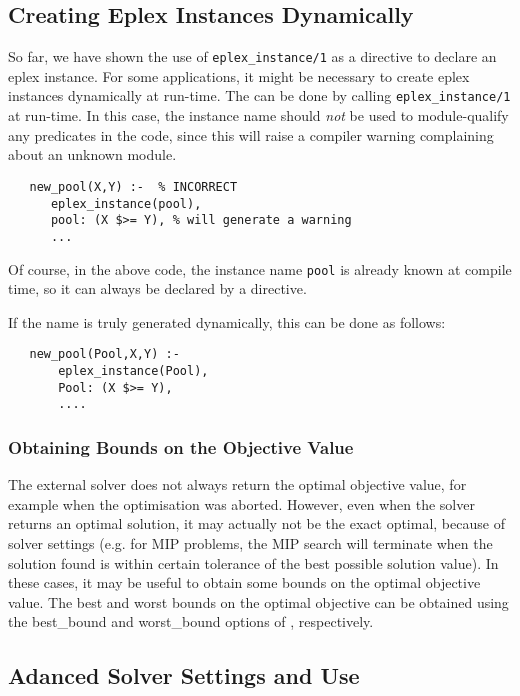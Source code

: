 \subsection{Creating Eplex Instances Dynamically}
So far, we have shown the use of {\tt eplex_instance/1} as a directive to
declare an eplex instance. For some applications, it might be necessary to
create eplex instances dynamically at run-time. The can be done by calling
{\tt eplex_instance/1} at run-time.
In this case, the instance name should {\em not} be used to module-qualify
any predicates in the code, since this will raise a compiler warning
complaining about an unknown module.

\begin{verbatim}
   new_pool(X,Y) :-  % INCORRECT
      eplex_instance(pool),
      pool: (X $>= Y), % will generate a warning
      ...
\end{verbatim}
\noindent
Of course, in the above code, the instance name {\tt pool} is already known
at compile time, so it can always be declared by a directive.

If the name is truly generated dynamically, this can be done as follows:
\begin{verbatim}
   new_pool(Pool,X,Y) :-
       eplex_instance(Pool),
       Pool: (X $>= Y),
       ....
\end{verbatim}

\subsubsection{Obtaining Bounds on the Objective Value}

The external solver does not always return the optimal objective
value, for example when the optimisation was aborted. However, even when
the solver returns an optimal solution, it may actually not be the exact
optimal, because of solver settings (e.g. for MIP problems, the MIP search
will terminate when the solution found is within certain tolerance of the
best possible solution value). In these cases, it may be useful to obtain
some bounds on the optimal objective value. The best and worst bounds on
the optimal objective can be obtained using the best_bound and worst_bound
options of ,
respectively. 

\subsection{Adanced Solver Settings and Use}

